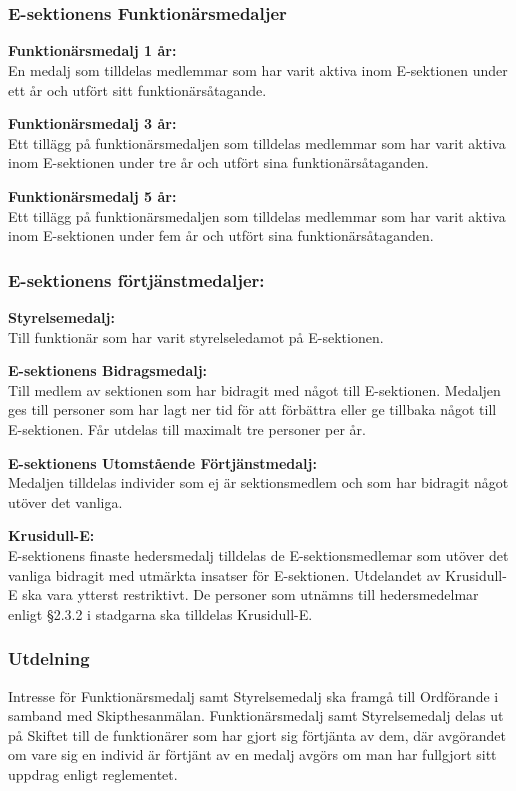 \documentclass[10pt]{article}
\begin{document}
\section*{\doctitle}


\subsubsection*{E-sektionens Funktionärsmedaljer}
\textbf{Funktionärsmedalj 1 år:}\\
En medalj som tilldelas medlemmar som har varit aktiva inom E-sektionen under ett år och utfört sitt funktionärsåtagande.

\textbf{Funktionärsmedalj 3 år:}\\
Ett tillägg på funktionärsmedaljen som tilldelas medlemmar som har varit aktiva inom E-sektionen under tre år och utfört sina funktionärsåtaganden.

\textbf{Funktionärsmedalj 5 år:}\\
Ett tillägg på funktionärsmedaljen som tilldelas medlemmar som har varit aktiva inom E-sektionen under fem år och utfört sina funktionärsåtaganden.

\subsubsection*{E-sektionens förtjänstmedaljer:}
\textbf{Styrelsemedalj:}\\
Till funktionär som har varit styrelseledamot på E-sektionen.

\textbf{E-sektionens Bidragsmedalj:}\\
Till medlem av sektionen som har bidragit med något till E-sektionen. Medaljen ges till personer som har lagt ner tid för att förbättra eller ge tillbaka något till E-sektionen. Får utdelas till maximalt tre personer per år.

\textbf{E-sektionens Utomstående Förtjänstmedalj:}\\
Medaljen tilldelas individer som ej är sektionsmedlem och som har bidragit något utöver det vanliga.

\textbf{Krusidull-E:}\\
E-sektionens finaste hedersmedalj tilldelas de E-sektionsmedlemar som utöver det vanliga bidragit med utmärkta insatser för E-sektionen. Utdelandet av Krusidull-E ska vara ytterst restriktivt. De personer som utnämns till hedersmedelmar enligt §2.3.2 i stadgarna ska tilldelas Krusidull-E.

\subsubsection*{Utdelning}
Intresse för Funktionärsmedalj samt Styrelsemedalj ska framgå till Ordförande i samband med Skipthesanmälan. Funktionärsmedalj samt Styrelsemedalj delas ut på Skiftet till de funktionärer som har gjort sig förtjänta av dem, där avgörandet om vare sig en individ är förtjänt av en medalj avgörs om man har fullgjort sitt uppdrag enligt reglementet.
\end{document}
